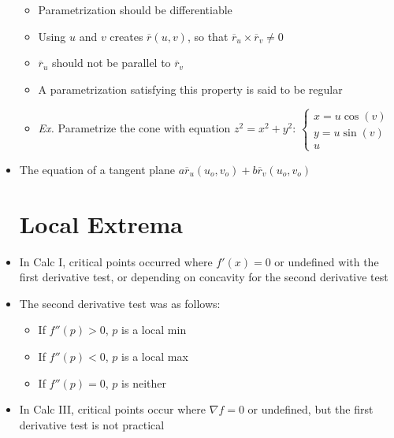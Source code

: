 \begin{itemize}
    \begin{itemize}

      \item Parametrization should be differentiable

      \item Using $u$ and $v$ creates $\overline{r}(u,v)$, so that $\overline{r}_u \times \overline{r}_v \neq 0$

      \item $\overline{r}_u$ should not be parallel to $\overline{r}_v$

      \item A parametrization satisfying this property is said to be regular

      \item \textit{Ex. } Parametrize the cone with equation $z^2=x^2+y^2$: $\left\{\begin{array}{c} x=u\cos(v)\\y=u\sin(v)\\u \end{array}$

    \end{itemize}

  \item The equation of a tangent plane $a\overline{r}_u(u_o,v_o)+b\overline{r}_v(u_o,v_o)$

    \section{Local Extrema}

  \item In Calc I, critical points occurred where $f'(x)=0$ or undefined with the first derivative test, or depending on concavity for the second derivative test

  \item The second derivative test was as follows:

    \begin{itemize}

      \item If $f''(p) > 0$, $p$ is a local min

      \item If $f''(p) < 0$, $p$ is a local max

      \item If $f''(p) = 0$, $p$ is neither

    \end{itemize}

  \item In Calc III, critical points occur where $\nabla f = 0$ or undefined, but the first derivative test is not practical


\end{itemize}
